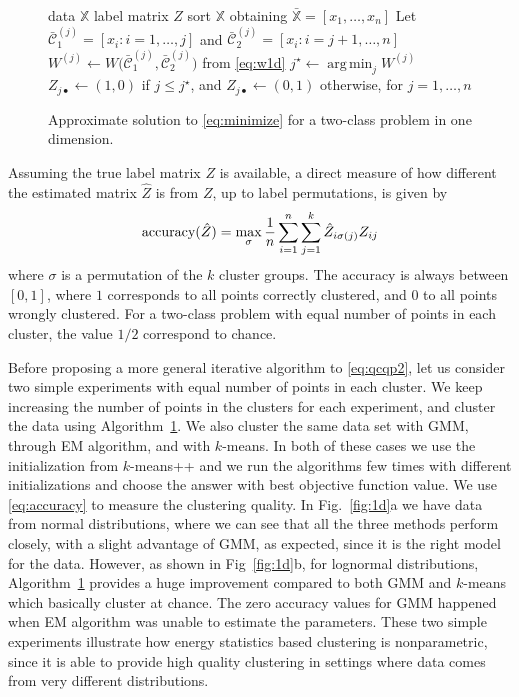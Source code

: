 \documentclass[aps,preprint,nofootinbib,floatfix]{revtex4-1}
\DeclareMathOperator*{\argmin}{arg\,min}
\newcommand\C{{\mathcal{C}}}
\begin{document}
\begin{figure}
\begin{algorithm}[H]\vspace{.5em}
\begin{algorithmic}[1]
\INPUT data $\mathbb{X}$
\OUTPUT label matrix $Z$
\STATE sort $\mathbb{X}$ obtaining 
$\bar{\mathbb{X}}= [ x_1,\dotsc,x_n ]$
        \STATE Let $\bar{\C}_1^{(j)} = [x_i: i=1,\dotsc,j]$ and 
                $\bar{\C}_2^{(j)} = [x_i : i=j+1,\dotsc,n]$
        \STATE  
            $W^{(j)} \leftarrow W \big( \bar{\C}_1^{(j)},\bar{\C}_2^{(j)}  
            \big)$ from \eqref{eq:w1d}
    \ENDFOR
    \STATE $j^\star \leftarrow \argmin_j W^{(j)}$ 
    \STATE $Z_{j\bullet} \leftarrow (1,0) $ if $j\le j^\star$, and
           $Z_{j\bullet} \leftarrow (0,1)$ otherwise, for $j=1,\dotsc,n$
\end{algorithmic}
\caption{
\label{algo1d}
Approximate solution to \eqref{eq:minimize} 
for a two-class problem in one dimension. \hspace{\fill}
}
\end{algorithm}
\end{figure}

Assuming the true label matrix $Z$ is available, a direct
measure of how different the estimated matrix $\hat{Z}$ 
is from $Z$, up to label
permutations, is given by
\begin{equation}
\label{eq:accuracy}
\textnormal{accuracy}(\hat{Z}) = \max_\sigma 
\dfrac{1}{n}\sum_{i=1}^n\sum_{j=1}^k \hat{Z}_{i \sigma(j)} Z_{ij}
\end{equation}
where $\sigma$ is a permutation
of the $k$ cluster groups. 
The accuracy is always between $[0,1]$, where
$1$ corresponds to all points correctly clustered, and 
$0$ to all points wrongly clustered.
For a two-class problem with equal
number of points in each cluster, the value $1/2$ correspond
to chance.

Before proposing a more general iterative algorithm to \eqref{eq:qcqp2},
let us consider two simple experiments with equal number of points
in each cluster. 
We keep increasing the number of points in the clusters for each experiment, 
and cluster the data using Algorithm~\ref{algo1d}. 
We also cluster the same data set
with GMM, through EM algorithm, and with $k$-means. In both of these
cases we use the initialization from $k$-means++ \cite{Vassilvitskii} 
and we run the algorithms
few times with different initializations and choose the answer
with best objective function value. We use \eqref{eq:accuracy} to measure
the clustering quality. 
In  Fig.~\ref{fig:1d}a 
we have data from normal distributions,
where we can see that all the three methods
perform closely, with a slight advantage of GMM, as expected, since
it is the right model for the data. However, as shown in Fig~\ref{fig:1d}b,
for lognormal distributions, Algorithm~\ref{algo1d} provides a huge improvement
compared to both GMM and $k$-means which basically cluster at chance.
The zero accuracy values for GMM happened when EM algorithm was unable
to estimate the parameters. These two simple experiments illustrate
how energy statistics based clustering is nonparametric, since it is able
to provide high quality clustering in settings where data comes
from very different distributions.
\end{document}
